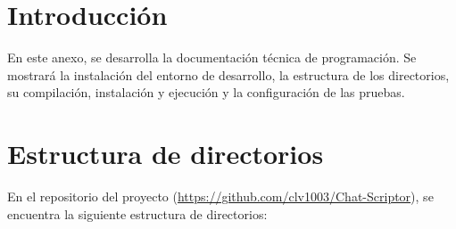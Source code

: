 
\section{Introducción}
En este anexo, se desarrolla la documentación técnica de programación. Se mostrará la instalación del entorno de desarrollo, la estructura de los directorios, su compilación, instalación y ejecución y la configuración de las pruebas.

\section{Estructura de directorios}
En el repositorio del proyecto (\url{https://github.com/clv1003/Chat-Scriptor}), se encuentra la siguiente estructura de directorios:

